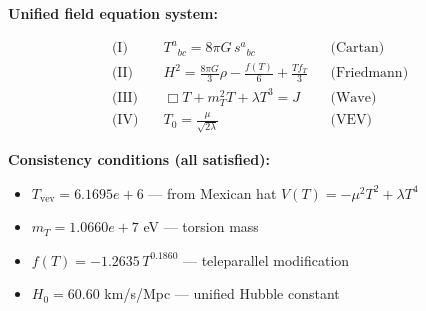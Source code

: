 
\textbf{Unified field equation system:}

\begin{align}
  \text{(I)} \quad & T^a{}_{bc} = 8\pi G \, s^a{}_{bc} && \text{(Cartan)} \\
  \text{(II)} \quad & H^2 = \frac{8\pi G}{3}\rho - \frac{f(T)}{6} + \frac{Tf_T}{3} && \text{(Friedmann)} \\
  \text{(III)} \quad & \Box T + m_T^2 T + \lambda T^3 = J && \text{(Wave)} \\
  \text{(IV)} \quad & T_0 = \frac{\mu}{\sqrt{2\lambda}} && \text{(VEV)}
\end{align}

\textbf{Consistency conditions (all satisfied):}
\begin{itemize}
  \item $T_{\text{vev}} = 6.1695e+6$ — from Mexican hat $V(T) = -\mu^2 T^2 + \lambda T^4$
  \item $m_T = 1.0660e+7$ eV — torsion mass
  \item $f(T) = -1.2635 \, T^{0.1860}$ — teleparallel modification
  \item $H_0 = 60.60$ km/s/Mpc — unified Hubble constant
\end{itemize}